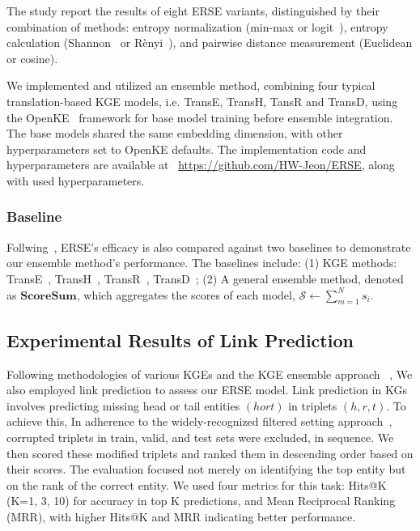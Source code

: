 \documentclass{article}
\begin{document}
The study report the results of eight ERSE variants, distinguished by their combination of methods: entropy normalization (min-max or logit~\cite{berkson1944application}), entropy calculation (Shannon~\cite{shannon1948mathematical} or R\`enyi~\cite{renyi1961measures}), and pairwise distance measurement (Euclidean or cosine).

 We implemented and utilized an ensemble method, combining four typical translation-based KGE models, i.e. TransE, TransH, TansR and TransD, using the OpenKE~\cite{han-etal-2018-openke} framework for base model training before ensemble integration. The base models shared the same embedding dimension, with other hyperparameters set to OpenKE defaults. The implementation code and hyperparameters are available at ~\hyperlink{https://github.com/HW-Jeon/ERSE}{https://github.com/HW-Jeon/ERSE}, along with used hyperparameters.

\subsubsection{Baseline}
Follwing~\cite{WANG20221041}, ERSE's efficacy is also compared against two baselines to demonstrate our ensemble method's performance. The baselines include: (1) KGE methods: TransE~\cite{bordes2013translating}, TransH~\cite{wang2014knowledge}, TransR~\cite{lin2015learning}, TransD~\cite{ji2015knowledge};  (2) A general ensemble method, denoted as $\mathbf{ScoreSum}$, which aggregates the scores of each model, $\mathcal{S} \leftarrow \sum_{m=1}^{N} s\acute{}_i$.



\subsection{Experimental Results of Link Prediction}
Following methodologies of various KGEs and the KGE ensemble approach ~\cite{WANG20221041}, We also employed link prediction to assess our ERSE model. Link prediction in KGs involves predicting missing head or tail entities $(h or t)$ in triplets $(h, r, t)$. To achieve this, In adherence to the widely-recognized filtered setting approach~\cite{bordes2013translating}, corrupted triplets in train, valid, and test sets were excluded, in sequence. We then scored these modified triplets and ranked them in descending order based on their scores. The evaluation focused not merely on identifying the top entity but on the rank of the correct entity. We used four metrics for this task: Hits@K (K=1, 3, 10) for accuracy in top K predictions, and Mean Reciprocal Ranking (MRR), with higher Hits@K and MRR indicating better performance.
\end{document}
